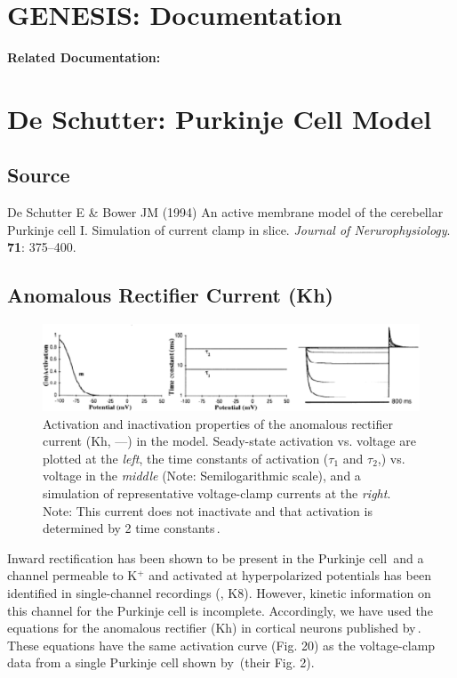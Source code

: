 \documentclass[12pt]{article}
\begin{document}
\section*{GENESIS: Documentation}

{\bf Related Documentation:}

\section*{De Schutter: Purkinje Cell Model}

\subsection*{Source}

De Schutter E \& Bower JM (1994) An active membrane model of the cerebellar Purkinje cell I. Simulation of current clamp in slice. {\it Journal of Nerurophysiology}. {\bf 71}: 375--400. \\

\subsection*{Anomalous Rectifier Current (Kh)}

\begin{figure}[h]
\centering
   \includegraphics[scale=0.75]{figures/DS1.2D.eps}
   \caption{Activation and inactivation properties of the anomalous rectifier current (Kh, ---) in the model. Seady-state activation vs. voltage are plotted at the {\em left}, the time constants of activation ($\tau_1$ and $\tau_2$,) vs. voltage in the {\em middle} (Note: Semilogarithmic scale), and a simulation of representative voltage-clamp currents at the {\em right}. Note: This current does not inactivate and that activation is determined by 2 time constants\,\cite{Spain-W-J:1987ij}.}
   \label{fig:DS1.2D}
\end{figure}

Inward rectification has been shown to be present in the Purkinje cell\,\cite{Crepel:1986cr, Hounsgaard:1988nx} and a channel permeable to K$^+$ and activated at hyperpolarized potentials has been identified in single-channel recordings (\cite{Gruol:1989oq}, K8). However, kinetic information on this channel for the Purkinje cell is incomplete. Accordingly, we have used the equations for the anomalous rectifier (Kh) in cortical neurons published by\,\cite{Spain-W-J:1987ij}. These equations have the same activation curve (Fig. 20) as the voltage-clamp data from a single Purkinje cell shown by\,\cite{Crepel:1986cr} (their Fig. 2).



\end{document}
